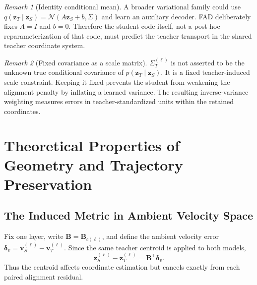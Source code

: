 \documentclass{article}
\newcommand{\calN}{\mathcal{N}}
\newcommand{\bB}{\boldsymbol{B}}
\newcommand{\bz}{\boldsymbol{z}}
\newcommand{\bv}{\boldsymbol{v}}
\newcommand{\bSigma}{\varSigma}
\newcommand{\bI}{I}
\theoremstyle{plain}
\theoremstyle{definition}
\theoremstyle{remark}
\newtheorem{remark}{Remark}
\begin{document}
\begin{remark}[Identity conditional mean]
\label{rem:app-identity-decoder}
A broader variational family could use
$q(\bz_T\mid\bz_S)=\calN(A\bz_S+b,\bSigma)$ and learn an auxiliary decoder.
FAD deliberately fixes $A=\bI$ and $b=0$.  Therefore the student code itself,
not a post-hoc reparameterization of that code, must predict the teacher transport
in the shared teacher coordinate system.
\end{remark}

\begin{remark}[Fixed covariance as a scale matrix]
\label{rem:app-fixed-covariance}
$\bSigma_T^{(\ell)}$ is not asserted to be the unknown true conditional covariance
of $p(\bz_T\mid\bz_S)$.  It is a fixed teacher-induced scale constraint.  Keeping
it fixed prevents the student from weakening the alignment penalty by inflating a
learned variance.  The resulting inverse-variance weighting measures errors in
teacher-standardized units within the retained coordinates.
\end{remark}

\FloatBarrier
\section{Theoretical Properties of Geometry and Trajectory Preservation}
\label{app:theory-properties}

\subsection{The Induced Metric in Ambient Velocity Space}
\label{app:ambient-metric}

Fix one layer, write $\bB=\bB_{c(\ell)}$, and define the ambient velocity error
$\boldsymbol\delta_v=\bv_S^{(\ell)}-\bv_T^{(\ell)}$.  Since the same teacher
centroid is applied to both models,
\begin{equation}
  \bz_S^{(\ell)}-\bz_T^{(\ell)}
  =\bB^\top\boldsymbol\delta_v.
  \label{eq:app-centering-cancels}
\end{equation}
Thus the centroid affects coordinate estimation but cancels exactly from each
paired alignment residual.
\end{document}

